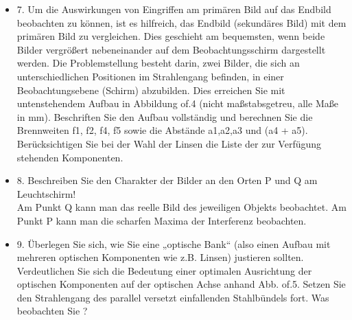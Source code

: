 \begin{itemize}
	
	\item 7. Um die Auswirkungen von Eingriffen am primären Bild auf das Endbild beobachten zu können,
	ist es hilfreich, das Endbild (sekundäres Bild) mit dem primären Bild zu vergleichen.
	Dies geschieht am bequemsten, wenn beide Bilder vergrößert nebeneinander auf dem Beobachtungsschirm
	dargestellt werden. Die Problemstellung besteht darin, zwei Bilder, die sich an
	unterschiedlichen Positionen im Strahlengang befinden, in einer Beobachtungsebene (Schirm)
	abzubilden. Dies erreichen Sie mit untenstehendem Aufbau in Abbildung of.4 (nicht maßstabsgetreu,
	alle Maße in mm). Beschriften Sie den Aufbau vollständig und berechnen Sie die Brennweiten
	f1, f2, f4, f5 sowie die Abstände a1,a2,a3 und (a4 + a5). Berücksichtigen Sie bei der
	Wahl der Linsen die Liste der zur Verfügung stehenden Komponenten.
	\item 8. Beschreiben Sie den Charakter der Bilder an den Orten P und Q am Leuchtschirm!\\
	Am Punkt Q kann man das reelle Bild des jeweiligen Objekts beobachtet.
	Am Punkt P kann man die scharfen Maxima der Interferenz beobachten.
\item 9. Überlegen Sie sich, wie Sie eine „optische Bank“ (also einen Aufbau mit mehreren optischen
	Komponenten wie z.B. Linsen) justieren sollten. Verdeutlichen Sie sich die Bedeutung einer
	optimalen Ausrichtung der optischen Komponenten auf der optischen Achse anhand Abb. of.5.
	Setzen Sie den Strahlengang des parallel versetzt einfallenden Stahlbündels fort. Was beobachten
	Sie ?
	
\end{itemize}
